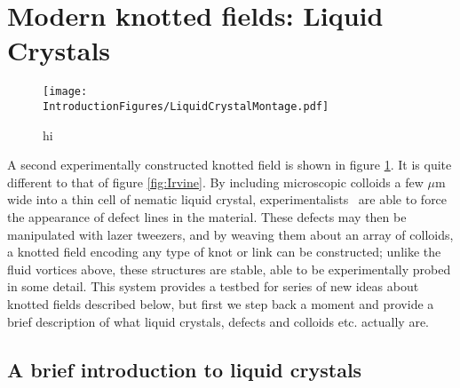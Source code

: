\section{Modern knotted fields: Liquid Crystals}
\begin{figure}[htbp]
\centering
\texttt{[image: \\IntroductionFigures/LiquidCrystalMontage.pdf]}
\caption{hi }
\label{fig:KnottedLiquidCrystal}
\end{figure}
A second experimentally constructed knotted field is shown in figure \ref{fig:KnottedLiquidCrystal}. It is quite different to that of figure \ref{fig:Irvine}. By including microscopic colloids a few $\mu$m wide into a thin cell of nematic liquid crystal, experimentalists~\citep{Tkalec2011,Tasinkevych2014,Copar2015} are able to force the appearance of defect lines in the material. These defects may then be manipulated with lazer tweezers, and by weaving them about an array of colloids, a knotted field encoding any type of knot or link can be constructed; unlike the fluid vortices above, these structures are stable, able to be experimentally probed in some detail. This system provides a testbed for series of new ideas about knotted fields described below, but first we step back a moment and provide a brief description of what liquid crystals, defects and colloids etc. actually are.

\subsection{A brief introduction to liquid crystals}

